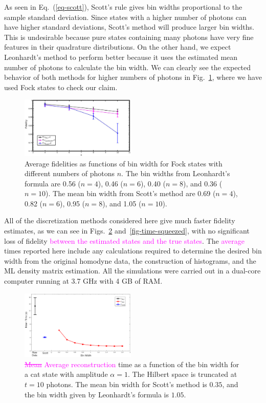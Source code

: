 \documentclass[
reprint,
superscriptaddress,
showpacs,
amsmath,
amssymb,
aps,
pra,
longbibliography
]{revtex4-1}
\providecommand{\aucmnt}[1]{#1}
\providecommand{\editcolor}[2]{\textcolor{#1}{#2}}
\providecommand{\aucmnt}[1]{}
\providecommand{\editcolor}[2]{#2}
\newcommand{\SG}[1]{\editcolor{magenta}{#1}}
\newcommand{\SGs}[1]{\aucmnt{\editcolor{magenta}{\sout{#1}}}}
\begin{document}
As seen in Eq.~(\ref{eq-scott}), Scott's rule gives bin widths
proportional to the sample standard deviation. Since states with a
higher number of photons can have higher standard deviations,
Scott's method will produce larger bin widths. This is
undesirable because pure states containing many photons have very
fine features in their quadrature distributions. On the other
hand, we expect Leonhardt's method to perform better
because it uses the estimated mean number of photons
to calculate the bin width. We can clearly see the expected behavior
of both methods for higher numbers of photons in Fig.~\ref{fig-fock},
where we have used Fock states to check our claim.

\begin{figure}
  \includegraphics[width=0.49\textwidth]{fock.eps}
  \caption{Average fidelities as functions of bin width for Fock
    states with different numbers of photons $n$. The bin widths from
    Leonhardt's formula are 0.56 ($n=4$), 0.46 ($n=6$), 0.40 ($n=8$),
    and 0.36 ($n=10$). The mean bin width from Scott's method are 0.69
    ($n=4$), 0.82 ($n=6$), 0.95 ($n=8$), and 1.05 ($n=10$).}
  \label{fig-fock}
\end{figure}

All of the discretization methods considered here give much faster
fidelity estimates, as we can see in Figs.~\ref{fig-time-catstate}
and~\ref{fig-time-squeezed}, with no significant loss of fidelity
\SG{between the estimated states and the true states}. The
\SG{average} times reported here include any calculations required to
determine the desired bin width from the original homodyne data, the
construction of histograms, and the ML density matrix estimation. All
the simulations were carried out in a dual-core computer running at
3.7 GHz with 4 GB of RAM.

\begin{figure}
  \includegraphics[width=0.49\textwidth]{time-estadogato_alpha_1.eps}
  \caption{\SGs{Mean} \SG{Average reconstruction} time as a function
    of the bin width for a cat state with amplitude $\alpha = 1$. The
    Hilbert space is truncated at $t=10$ photons. The mean bin width
    for Scott's method is $0.35$, and the bin width given by
    Leonhardt's formula is $1.05$.}
  \label{fig-time-catstate}
\end{figure}
\end{document}
